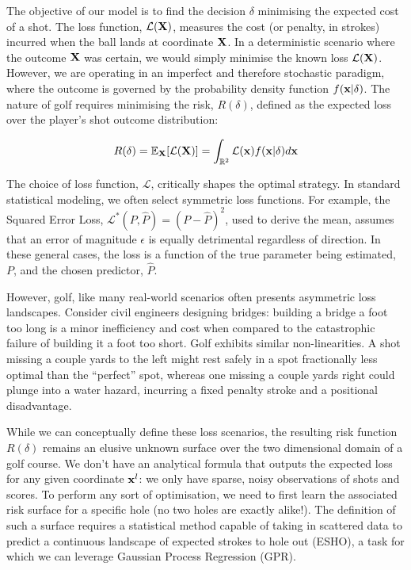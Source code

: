 \documentclass[11pt, letterpaper]{article}
\begin{document}
The objective of our model is to find the decision $\delta$ minimising the expected cost of a shot. The loss function, $\mathcal{L}(\mathbf{X})$, measures the cost (or penalty, in strokes) incurred when the ball lands at coordinate $\mathbf{X}$. In a deterministic scenario where the outcome $\mathbf{X}$ was certain, we would simply minimise the known loss $\mathcal{L}(\mathbf{X})$. However, we are operating in an imperfect and therefore stochastic paradigm, where the outcome is governed by the probability density function $f(\mathbf{x} | \delta)$. The nature of golf requires minimising the risk, $R(\delta)$, defined as the expected loss over the player's shot outcome distribution:

$$R(\delta) = \mathbb{E}_{\mathbf{X}}[\mathcal{L}(\mathbf{X})] = \int_{\mathbb{R}^2}\mathcal{L}(\mathbf{x})f(\mathbf{x} | \delta)d\mathbf{x}$$

The choice of loss function, $\mathcal{L}$, critically shapes the optimal strategy. In standard statistical modeling, we often select symmetric loss functions. For example, the Squared Error Loss, $\mathcal{L}^*(P, \hat{P}) = (P - \hat{P})^2 $, used to derive the mean, assumes that an error of magnitude $\epsilon$ is equally detrimental regardless of direction. In these general cases, the loss is a function of the true parameter being estimated, $P$, and the chosen predictor, $\hat{P}$.

However, golf, like many real-world scenarios often presents asymmetric loss landscapes. Consider civil engineers designing bridges: building a bridge a foot too long is a minor inefficiency and cost when compared to the catastrophic failure of building it a foot too short. Golf exhibits similar non-linearities. A shot missing a couple yards to the left might rest safely in a spot fractionally less optimal than the ``perfect'' spot, whereas one missing a couple yards right could plunge into a water hazard, incurring a fixed penalty stroke and a positional disadvantage.

While we can conceptually define these loss scenarios, the resulting risk function $R(\delta)$ remains an elusive unknown surface over the two dimensional domain of a golf course. We don't have an analytical formula that outputs the expected loss for any given coordinate $\mathbf{x}^l$: we only have sparse, noisy observations of shots and scores. To perform any sort of optimisation, we need to first learn the associated risk surface for a specific hole (no two holes are exactly alike!). The definition of such a surface requires a statistical method capable of taking in scattered data to predict a continuous landscape of expected strokes to hole out (ESHO), a task for which we can leverage Gaussian Process Regression (GPR). 
\end{document}
